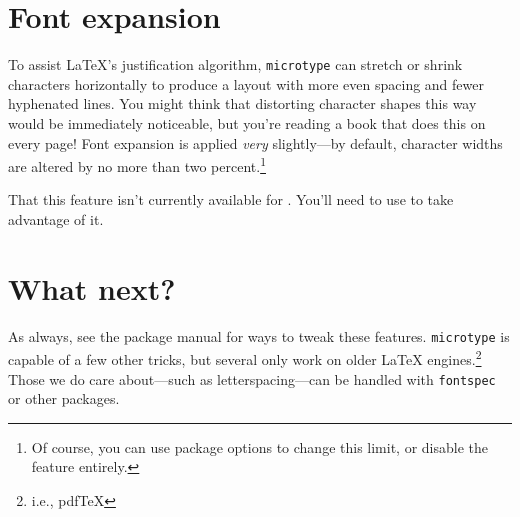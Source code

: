 \section{Font expansion}

To assist \LaTeX's justification algorithm,
\texttt{microtype} can
stretch or shrink characters horizontally to produce a layout
with more even spacing and fewer hyphenated lines.
You might think that distorting character shapes this way would be immediately
noticeable,
but you're reading a book that does this on every page!
Font expansion is applied \emph{very} slightly---by default,
character widths are altered by no more than two percent.\punckern\footnote{%
Of course, you can use package options to change this limit,
or disable the feature entirely.}

That this feature isn't currently available for \XeLaTeX{}.
You'll need to use \LuaLaTeX{} to take advantage of it.

\section{What next?}

As always, see the package manual for ways to tweak these features.
\texttt{microtype} is capable of a few other tricks,
but several only work on older \LaTeX{} engines.\punckern\footnote{i.e., pdf\TeX}
Those we do care about---such as letterspacing---can be handled with
\texttt{fontspec} or other packages.
